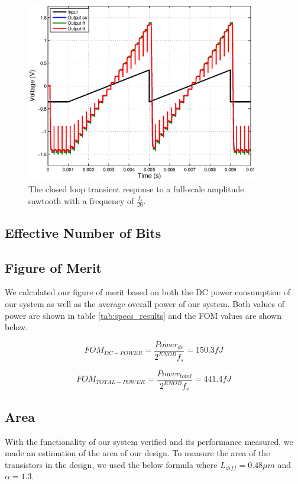 \documentclass[journal]{IEEEtran}
\begin{document}
\begin{figure}
\centering
\includegraphics[width=4in]{Plots/closed_saw.eps}
\caption{The closed loop transient response to a full-scale amplitude sawtooth with a frequency of $\frac{f_s}{20}$.}
\label{fig:closed_saw}
\end{figure}

\subsection{Effective Number of Bits}

\subsection{Figure of Merit}
We calculated our figure of merit based on both the DC power consumption of our system as well as the average overall power of our system. Both values of power are shown in table \ref{tab:specs_results} and the FOM values are shown below.

\begin{equation}
FOM_{DC-POWER} = \frac{Power_{dc}}{2^{ENOB}f_s} = 150.3 fJ
\end{equation}

\begin{equation}
FOM_{TOTAL-POWER} = \frac{Power_{total}}{2^{ENOB}f_s} = 441.4 fJ
\end{equation}

\subsection{Area}
With the functionality of our system verified and its performance measured, we made an estimation of the area of our design. To measure the area of the transistors in the design, we used the below formula where $L_{diff} = 0.48 \mu m$ and $\alpha = 1.3$.
\end{document}
